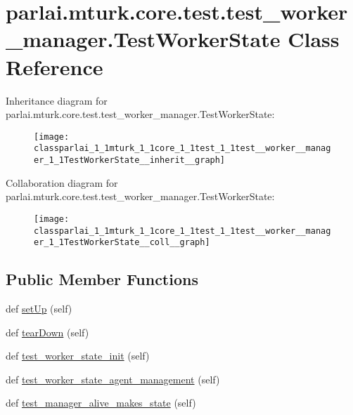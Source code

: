 \hypertarget{classparlai_1_1mturk_1_1core_1_1test_1_1test__worker__manager_1_1TestWorkerState}{}\section{parlai.\+mturk.\+core.\+test.\+test\+\_\+worker\+\_\+manager.\+Test\+Worker\+State Class Reference}
\label{classparlai_1_1mturk_1_1core_1_1test_1_1test__worker__manager_1_1TestWorkerState}


Inheritance diagram for parlai.\+mturk.\+core.\+test.\+test\+\_\+worker\+\_\+manager.\+Test\+Worker\+State\+:
\nopagebreak
\begin{figure}[H]
\begin{center}
\leavevmode
\texttt{[image: classparlai\_1\_1mturk\_1\_1core\_1\_1test\_1\_1test\_\_worker\_\_manager\_1\_1TestWorkerState\_\_inherit\_\_graph]}
\end{center}
\end{figure}


Collaboration diagram for parlai.\+mturk.\+core.\+test.\+test\+\_\+worker\+\_\+manager.\+Test\+Worker\+State\+:
\nopagebreak
\begin{figure}[H]
\begin{center}
\leavevmode
\texttt{[image: classparlai\_1\_1mturk\_1\_1core\_1\_1test\_1\_1test\_\_worker\_\_manager\_1\_1TestWorkerState\_\_coll\_\_graph]}
\end{center}
\end{figure}
\subsection*{Public Member Functions}
\begin{DoxyCompactItemize}
\item 
def \hyperlink{classparlai_1_1mturk_1_1core_1_1test_1_1test__worker__manager_1_1TestWorkerState_a47d23608a1b8d69530edab71fd303709}{set\+Up} (self)
\item 
def \hyperlink{classparlai_1_1mturk_1_1core_1_1test_1_1test__worker__manager_1_1TestWorkerState_ad3684725733a84ad658c4f93e1b35d98}{tear\+Down} (self)
\item 
def \hyperlink{classparlai_1_1mturk_1_1core_1_1test_1_1test__worker__manager_1_1TestWorkerState_ae6d1fc64089d7d1ea4ebb85d752bba76}{test\+\_\+worker\+\_\+state\+\_\+init} (self)
\item 
def \hyperlink{classparlai_1_1mturk_1_1core_1_1test_1_1test__worker__manager_1_1TestWorkerState_ab4aac70dcfdc71324777342550211723}{test\+\_\+worker\+\_\+state\+\_\+agent\+\_\+management} (self)
\item 
def \hyperlink{classparlai_1_1mturk_1_1core_1_1test_1_1test__worker__manager_1_1TestWorkerState_ae309174115d3a034cd53e94eb68be3c7}{test\+\_\+manager\+\_\+alive\+\_\+makes\+\_\+state} (self)
\end{DoxyCompactItemize}

